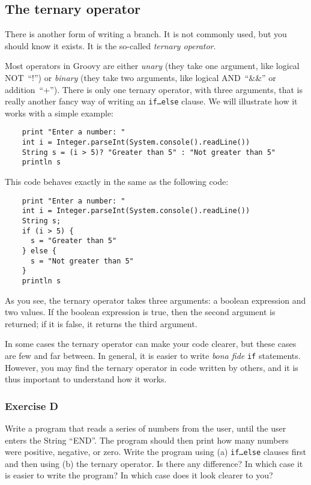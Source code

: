 \subsection{The ternary operator}
\label{sec:ternary-operator}

There is another form of writing a branch. It is not commonly used,
but you should know it exists. It is the so-called \emph{ternary
  operator}. 

Most operators in Groovy are either \emph{unary} (they take one
argument, like logical NOT~``!'') or \emph{binary} (they take two
arguments, like logical AND~``\&\&'' or addition~``+''). There is only
one ternary operator, with three arguments, that is really another
fancy way of writing an \texttt{if\ldots else} clause. We will
illustrate how it works with a simple example:

\begin{verbatim}
    print "Enter a number: "
    int i = Integer.parseInt(System.console().readLine())
    String s = (i > 5)? "Greater than 5" : "Not greater than 5"
    println s
\end{verbatim}

This code behaves exactly in the same as the following code:

\begin{verbatim}
    print "Enter a number: "
    int i = Integer.parseInt(System.console().readLine())
    String s;
    if (i > 5) {
      s = "Greater than 5"
    } else {
      s = "Not greater than 5"
    }
    println s
\end{verbatim}

As you see, the ternary operator takes three arguments: a boolean
expression and two values. If the boolean expression is true, then the
second argument is returned; if it is false, it returns the third
argument. 

In some cases the ternary operator can make your code clearer, but
these cases are few and far between. In general, it is easier to write
\emph{bona fide} \texttt{if} statements. However, you may find the
ternary operator in code written by others, and it is thus important
to understand how it works. 

\subsubsection*{Exercise D}

Write a program that reads a series of numbers from the user, until the
user enters the String ``END''. The program
should then print how many numbers were positive, negative, or
zero. Write the program using (a) \texttt{if\ldots else} clauses first 
and then using (b) the ternary operator. 
Is there any difference? In which case it is
easier to write the program? In which case does it look clearer to you?

